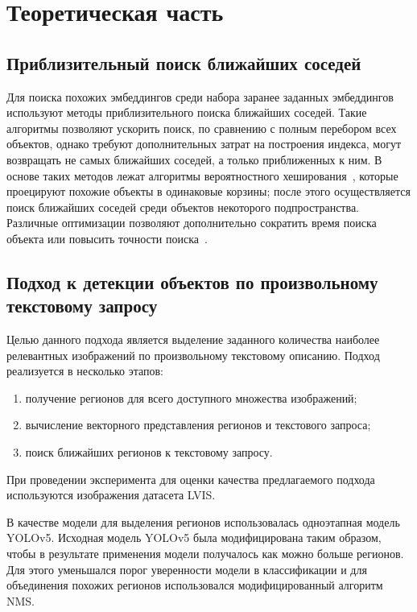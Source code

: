 \documentclass[a4paper,14pt]{article}
\begin{document}
    \newpage


    \section{Теоретическая часть}
    
    \subsection{Приблизительный поиск ближайших соседей}
    
    Для поиска похожих эмбеддингов среди набора заранее заданных эмбеддингов используют методы приблизительного поиска ближайших соседей.
    Такие алгоритмы позволяют ускорить поиск, по сравнению с полным перебором всех объектов, однако требуют дополнительных затрат на построения индекса, 
    могут возвращать не самых ближайших соседей, а только приближенных к ним.
    В основе таких методов лежат алгоритмы вероятностного хеширования~\cite{tao2010efficient}, которые проецируют похожие объекты в одинаковые корзины;
    после этого осуществляется поиск ближайших соседей среди объектов некоторого подпространства.
    Различные оптимизации позволяют дополнительно сократить время поиска объекта или повысить точности поиска~\cite{annoy,avq_2020}.
    
    \subsection{Подход к детекции объектов по произвольному текстовому запросу}
    
    Целью данного подхода является выделение заданного количества наиболее релевантных изображений по произвольному текстовому описанию. Подход реализуется в несколько этапов:
     \begin{enumerate}
    	[1)]
    	\itemsep0em
    	\item получение регионов для всего доступного множества изображений;
    	\item вычисление векторного представления регионов и текстового запроса;
    	\item поиск ближайших регионов к текстовому запросу.
    \end{enumerate}
    
    При проведении эксперимента для оценки качества предлагаемого подхода используются изображения датасета LVIS. 
    
    В качестве модели для выделения регионов использовалась одноэтапная модель YOLOv5. Исходная модель YOLOv5 была модифицирована таким образом, чтобы в результате применения модели получалось как можно больше регионов. Для этого уменьшался порог уверенности модели в классификации и для объединения похожих регионов использовался модифицированный алгоритм NMS. 
    
\end{document}
